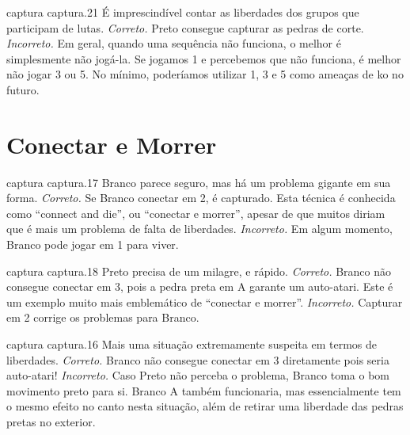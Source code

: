 \problemAnswerDiagram
  {captura}
  {captura.21}
  {É imprescindível contar as liberdades dos grupos que participam de lutas.}
  {\emph{Correto.} Preto consegue capturar as pedras de corte.}
  {\emph{Incorreto.} Em geral, quando uma sequência não funciona, o melhor é simplesmente não jogá-la. Se jogamos 1 e percebemos que não funciona, é melhor não jogar 3 ou 5. No mínimo, poderíamos utilizar 1, 3 e 5 como ameaças de ko no futuro.}

\chapter{Conectar e Morrer}

\emptypage

\problemAnswerDiagram
  {captura}
  {captura.17}
  {Branco parece seguro, mas há um problema gigante em sua forma.}
  {\emph{Correto.} Se Branco conectar em 2, é capturado. Esta técnica é conhecida como ``connect and die'', ou ``conectar e morrer'', apesar de que muitos diriam que é mais um problema de falta de liberdades.}
  {\emph{Incorreto.} Em algum momento, Branco pode jogar em 1 para viver.}

\problemAnswerDiagram
  {captura}
  {captura.18}
  {Preto precisa de um milagre, e rápido.}
  {\emph{Correto.} Branco não consegue conectar em 3, pois a pedra preta em A garante um auto-atari. Este é um exemplo muito mais emblemático de ``conectar e morrer''.}
  {\emph{Incorreto.} Capturar em 2 corrige os problemas para Branco.}

\problemAnswerDiagram
  {captura}
  {captura.16}
  {Mais uma situação extremamente suspeita em termos de liberdades.}
  {\emph{Correto.} Branco não consegue conectar em 3 diretamente pois seria auto-atari!}
  {\emph{Incorreto.} Caso Preto não perceba o problema, Branco toma o bom movimento preto para si. Branco A também funcionaria, mas essencialmente tem o mesmo efeito no canto nesta situação, além de retirar uma liberdade das pedras pretas no exterior.}